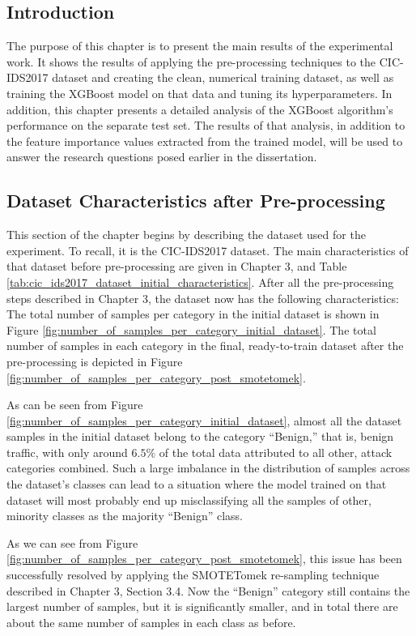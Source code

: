 \subsection{Introduction}

The purpose of this chapter is to present the main results of the experimental work. It shows the results of applying the pre-processing techniques to the CIC-IDS2017 dataset and creating the clean, numerical training dataset, as well as training the XGBoost model on that data and tuning its hyperparameters. In addition, this chapter presents a detailed analysis of the XGBoost algorithm’s performance on the separate test set. The results of that analysis, in addition to the feature importance values extracted from the trained model, will be used to answer the research questions posed earlier in the dissertation.

\subsection{Dataset Characteristics after Pre-processing}

This section of the chapter begins by describing the dataset used for the experiment. To recall, it is the CIC-IDS2017 dataset. The main characteristics of that dataset before pre-processing are given in Chapter 3, and Table \ref{tab:cic_ids2017_dataset_initial_characteristics}. After all the pre-processing steps described in Chapter 3, the dataset now has the following characteristics:\\

The total number of samples per category in the initial dataset is shown in Figure \ref{fig:number_of_samples_per_category_initial_dataset}. The total number of samples in each category in the final, ready-to-train dataset after the pre-processing is depicted in Figure \ref{fig:number_of_samples_per_category_post_smotetomek}.

As can be seen from Figure \ref{fig:number_of_samples_per_category_initial_dataset}, almost all the dataset samples in the initial dataset belong to the category “Benign,” that is, benign traffic, with only around $6.5\%$ of the total data attributed to all other, attack categories combined. Such a large imbalance in the distribution of samples across the dataset’s classes can lead to a situation where the model trained on that dataset will most probably end up misclassifying all the samples of other, minority classes as the majority “Benign” class.

As we can see from Figure \ref{fig:number_of_samples_per_category_post_smotetomek}, this issue has been successfully resolved by applying the SMOTETomek re-sampling technique described in Chapter 3, Section 3.4. Now the “Benign” category still contains the largest number of samples, but it is significantly smaller, and in total there are about the same number of samples in each class as before.

